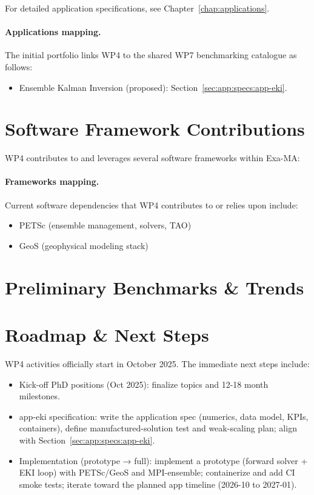 For detailed application specifications, see Chapter~\ref{chap:applications}.

\paragraph{Applications mapping.} The initial portfolio links WP4 to
the shared WP7 benchmarking catalogue as follows:
\begin{itemize}
	\item Ensemble Kalman Inversion (proposed): Section~\ref{sec:app:specs:app-eki}.
\end{itemize}

\section{Software Framework Contributions}
\label{sec:wp4:software}
WP4 contributes to and leverages several software frameworks within Exa-MA:

\paragraph{Frameworks mapping.} Current software dependencies that
WP4 contributes to or relies upon include:
\begin{itemize}
	\item PETSc (ensemble management, solvers, TAO)
	\item GeoS (geophysical modeling stack)
\end{itemize}

\section{Preliminary Benchmarks \& Trends}
\label{sec:wp4:benchmarks}

\section{Roadmap \& Next Steps}
\label{sec:wp4:roadmap}

WP4 activities officially start in October 2025. The immediate next steps include:
\begin{itemize}
	\item Kick-off PhD positions (Oct 2025): finalize topics and 12-18 month milestones.
	\item app-eki specification: write the application spec (numerics, data model, KPIs, containers), define manufactured-solution test and weak-scaling plan; align with Section~\ref{sec:app:specs:app-eki}.
	\item Implementation (prototype → full): implement a prototype (forward solver + EKI loop) with PETSc/GeoS and MPI-ensemble; containerize and add CI smoke tests; iterate toward the planned app timeline (2026-10 to 2027-01).
\end{itemize}
